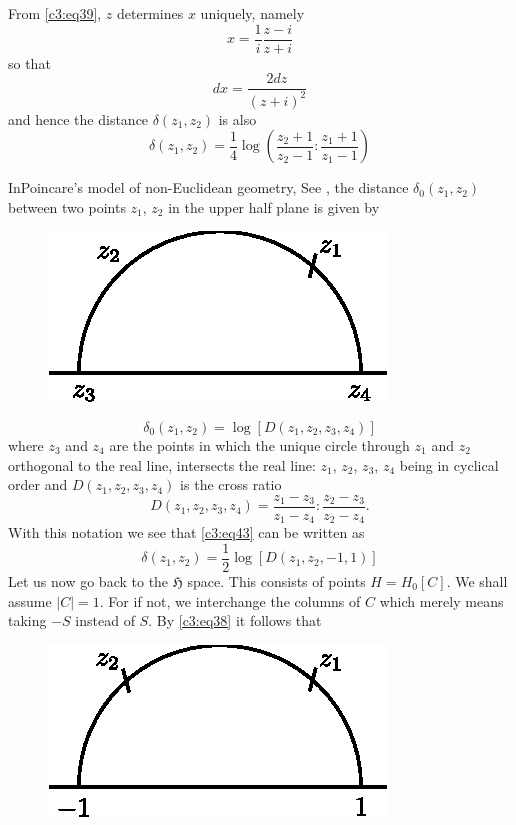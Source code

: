 From \eqref{c3:eq39}, $z$ determines $x$ uniquely, namely
\begin{equation*}
x=\frac{1}{i}\frac{z-i}{z+i}\tag{42}\label{c3:eq42}
\end{equation*}
so that
$$
dx=\frac{2dz}{(z+i)^{2}}
$$
and hence the distance $\delta(z_{1},z_{2})$ is also
\begin{equation*}
\delta(z_{1},z_{2})=\frac{1}{4}\log\left(\frac{z_{2}+1}{z_{2}-1}:\frac{z_{1}+1}{z_{1}-1}\right)\tag{43}\label{c3:eq43} 
\end{equation*}

In\pageoriginale Poincare's model of non-Euclidean geometry, See
\cite{c3:key11}, the distance $\delta_{0}(z_{1},z_{2})$ between two points
$z_{1}$, $z_{2}$ in the upper half plane is given by
\begin{figure}[H]
\centering
\includegraphics{fig2.eps}
\end{figure}
$$
\delta_{0}(z_{1},z_{2})=\log[D(z_{1},z_{2},z_{3},z_{4})]
$$
where $z_{3}$ and $z_{4}$ are the points in which the unique circle
through $z_{1}$ and $z_{2}$ orthogonal to the real line, intersects
the real line: $z_{1}$, $z_{2}$, $z_{3}$, $z_{4}$ being in cyclical
order and $D(z_{1},z_{2},z_{3},z_{4})$ is the cross ratio
$$
D(z_{1},z_{2},z_{3},z_{4})=\frac{z_{1}-z_{3}}{z_{1}-z_{4}}:\frac{z_{2}-z_{3}}{z_{2}-z_{4}}. 
$$
With this notation we see that \eqref{c3:eq43} can be written as 
\begin{equation*}
\delta(z_{1},z_{2})=\frac{1}{2}\log[D(z_{1},z_{2},-1,1)]\tag{45}\label{c3:eq45}
\end{equation*}
Let us now go back to the $\mathfrak{H}$ space. This consists of
points $H=H_{0}[C]$. We shall assume $|C|=1$. For if not, we
interchange the columns of $C$ which merely means taking $-S$ instead
of $S$. By \eqref{c3:eq38} it follows that 
\begin{figure}[H]
\centering
\includegraphics{fig3.eps}
\end{figure}
